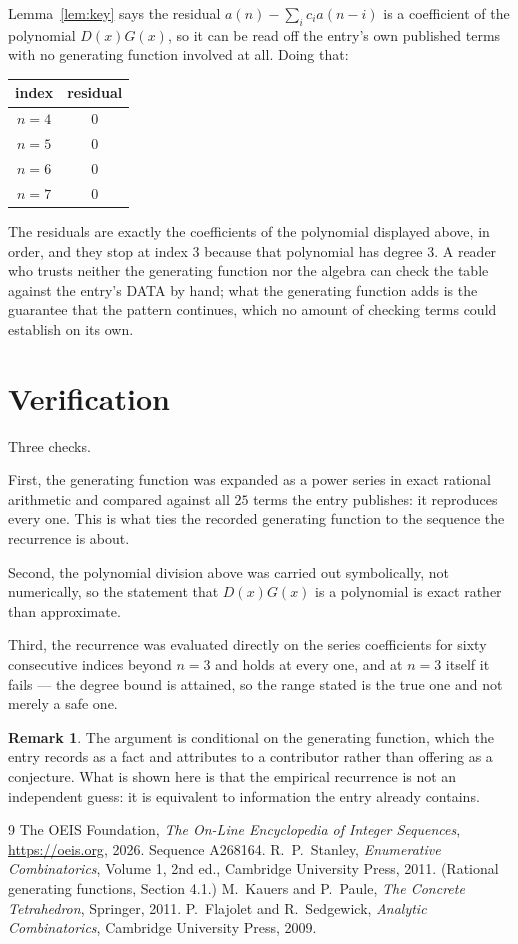 \documentclass[11pt,a4paper]{article}
\theoremstyle{plain}
\theoremstyle{definition}
\newtheorem{remark}[theorem]{Remark}
\begin{document}
Lemma~\ref{lem:key} says the residual $a(n)-\sum_ic_ia(n-i)$ is a coefficient of the
polynomial $D(x)G(x)$, so it can be read off the entry's own published terms with no
generating function involved at all. Doing that:
\begin{center}
\begin{tabular}{cc}
index & residual \\ \hline
$n=4$ & $0$ \\
$n=5$ & $0$ \\
$n=6$ & $0$ \\
$n=7$ & $0$
\end{tabular}
\end{center}
The residuals are exactly the coefficients of the polynomial displayed above, in order, and
they stop at index $3$ because that polynomial has degree $3$. A reader who trusts
neither the generating function nor the algebra can check the table against the entry's DATA
by hand; what the generating function adds is the guarantee that the pattern continues, which
no amount of checking terms could establish on its own.

\section{Verification}

Three checks.

First, the generating function was expanded as a power series in exact rational arithmetic and
compared against all $25$ terms the entry publishes: it reproduces every one. This is
what ties the recorded generating function to the sequence the recurrence is about.

Second, the polynomial division above was carried out symbolically, not numerically, so the
statement that $D(x)G(x)$ is a polynomial is exact rather than approximate.

Third, the recurrence was evaluated directly on the series coefficients for sixty consecutive
indices beyond $n=3$ and holds at every one, and at $n=3$ itself it fails --- the
degree bound is attained, so the range stated is the true one and not merely a safe one.

\begin{remark}
The argument is conditional on the generating function, which the entry records as a fact and
attributes to a contributor rather than offering as a conjecture. What is shown here is that
the empirical recurrence is not an independent guess: it is equivalent to information the
entry already contains.
\end{remark}

\begin{thebibliography}{9}
 The OEIS Foundation, \emph{The On-Line Encyclopedia of Integer
Sequences}, \url{https://oeis.org}, 2026. Sequence A268164.
 R.~P.~Stanley, \emph{Enumerative Combinatorics}, Volume 1, 2nd ed.,
Cambridge University Press, 2011. (Rational generating functions, Section 4.1.)
 M.~Kauers and P.~Paule, \emph{The Concrete Tetrahedron}, Springer, 2011.
 P.~Flajolet and R.~Sedgewick, \emph{Analytic Combinatorics}, Cambridge
University Press, 2009.
\end{thebibliography}
\end{document}
